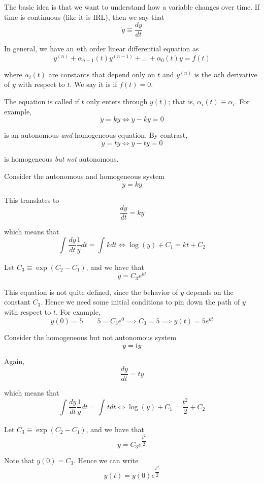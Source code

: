 \documentclass{article}
\begin{document}
The basic idea is that we want to understand how a variable changes over time. If time is continuous (like it is IRL), then we say that
\[
  \dot{y}
  \equiv
  \dfrac{dy}{dt}
\]

In general, we have an $n$th order linear differential equation as
\[
  y^{(n)} + \alpha_{n - 1}(t) y^{(n - 1)} + \ldots + \alpha_0(t) y = f(t)
\]

where $\alpha_{i}(t)$ are constants that depend only on $t$ and $y^{(n)}$ is the $n$th derivative of $y$ with respect to $t$. We say it is  if $f(t) = 0$.

The equation is called  if $t$ only enters through $y(t)$; that is, $\alpha_i(t) \equiv \alpha_i$. For example,
\[
  \dot{y} = k y
  \iff
  \dot{y} - k y = 0
\]

is an autonomous \textit{and} homogeneous equation. By contrast,
\[
  \dot{y} = t y
  \iff
  \dot{y} - t y = 0
\]

is homogeneous \textit{but not} autonomous.
\begin{example}
  Consider the autonomous and homogeneous system
  \[
    \dot{y} = ky
  \]

  This translates to
  \[
    \dfrac{dy}{dt} = ky
  \]

  which means that
  \[
    \int_{}^{} \dfrac{dy}{dt} \dfrac{1}{y} dt
    =
    \int_{}^{} k dt
    \iff
    \log(y) + C_1 = kt + C_2
  \]

  Let $C_3 \equiv \exp(C_2 - C_1)$, and we have that
  \[
    y = C_3 e^{kt}
  \]

  This equation is not quite defined, since the behavior of $y$ depends on the constant $C_3$. Hence we need some initial conditions to pin down the path of $y$ with respect to $t$. For example,
  \[
    y(0) = 5
    \quad\quad
    5 = C_3 e^{0}
    \implies
    C_3 = 5
    \implies
    y(t) = 5 e^{kt}
  \]
\end{example}

\begin{example}
  Consider the homogeneous but not autonomous system
  \[
    \dot{y} = ty
  \]


  Again,
  \[
    \dfrac{dy}{dt} = ty
  \]

  which means that
  \[
    \int_{}^{} \dfrac{dy}{dt} \dfrac{1}{y} dt
    =
    \int_{}^{} t dt
    \iff
    \log(y) + C_1 = \dfrac{t^2}{2} + C_2
  \]

  Let $C_3 \equiv \exp(C_2 - C_1)$, and we have that
  \[
    y = C_3 e^{\dfrac{t^2}{2}}
  \]

  Note that $y(0) = C_3$. Hence we can write
  \[
    y(t) = y(0) e^{\dfrac{t^2}{2}}
  \]
\end{example}
\end{document}
